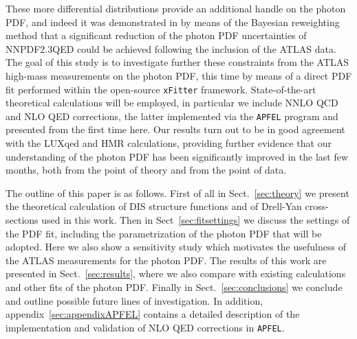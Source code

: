 These more differential distributions provide an additional handle
on the photon PDF, and indeed it was demonstrated in by means
of the Bayesian reweighting method that a significant reduction of
the photon PDF uncertainties of NNPDF2.3QED could be achieved
following the inclusion of the ATLAS data.
%
The goal of this study is to investigate further these constraints
from the ATLAS high-mass measurements on the photon PDF,
this time by means of a direct PDF fit performed within the
open-source {\tt xFitter} framework.
%
State-of-the-art theoretical calculations will be employed,
in particular
we include NNLO QCD and NLO QED corrections, the latter implemented
via the {\tt APFEL} program and presented from the first time
here.
%
Our results turn out to be in good agreement with the LUXqed and HMR
calculations, providing further evidence that our understanding
of the photon PDF has been significantly improved in the last
few months, both from the point of theory and from
the point of data.

The outline of this paper is as follows.
%
First of all in Sect.~\ref{sec:theory} we present the theoretical
calculation of DIS structure functions and of Drell-Yan cross-sections
used in this work.
%
Then in Sect~\ref{sec:fitsettings} we discuss the settings of
the PDF fit, including the parametrization of the photon PDF
that will be adopted.
%
Here we also show a sensitivity study which motivates the
usefulness of the ATLAS measurements for the photon PDF.
%
The results of this work are presented in Sect.~\ref{sec:results},
where we also compare with existing calculations and other
fits of the photon PDF.
%
Finally in Sect.~\ref{sec:conclusions} we conclude
and outline possible future lines of investigation.
%
In addition, appendix~\ref{sec:appendixAPFEL} contains a detailed description of
the implementation and validation of NLO QED corrections
in {\tt APFEL}.
